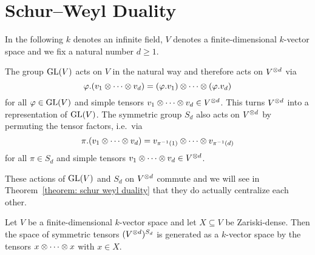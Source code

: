 \section{Schur--Weyl Duality}

\begin{conventions}
  In the following $k$ denotes an infinite field, $V$ denotes a finite-dimensional $k$-vector space and we fix a natural number $d \geq 1$.
\end{conventions}

\begin{fluff}
  The group $\operatorname{GL}(V)$ acts on $V$ in the natural way and therefore acts on $V^{\mathbin{\otimes} d}$ via
  \[
      \varphi.(v_1 \mathbin{\otimes} \dotsb \mathbin{\otimes} v_d)
    = (\varphi.v_1) \mathbin{\otimes} \dotsb \mathbin{\otimes} (\varphi.v_d)
  \]
  for all $\varphi \in \operatorname{GL}(V)$ and simple tensors $v_1 \mathbin{\otimes} \dotsb \mathbin{\otimes} v_d \in V^{\mathbin{\otimes} d}$.
  This turns $V^{\mathbin{\otimes} d}$ into a representation of $\operatorname{GL}(V)$.
  The symmetric group $S_d$ also acts on $V^{\mathbin{\otimes} d}$ by permuting the tensor factors, i.e.\ via
  \[
      \pi.(v_1 \mathbin{\otimes} \dotsb \mathbin{\otimes} v_d)
    = v_{\pi^{-1}(1)} \mathbin{\otimes} \dotsb \mathbin{\otimes} v_{\pi^{-1}(d)}
  \]
  for all $\pi \in S_d$ and simple tensors $v_1 \mathbin{\otimes} \dotsb \mathbin{\otimes} v_d \in V^{\mathbin{\otimes} d}$. 
  
  These actions of $\operatorname{GL}(V)$ and $S_d$ on $V^{\mathbin{\otimes} d}$ commute and we will see in Theorem~\ref{theorem: schur weyl duality} that they do actually centralize each other.
\end{fluff}


\begin{lemma}
  \label{lemma: symmetric tensors and zariski dense subsets}
  Let $V$ be a finite-dimensional $k$-vector space and let $X \subseteq V$ be Zariski-dense.
  Then the space of symmetric tensors $( V^{\mathbin{\otimes} d} )^{S_d}$ is generated as a $k$-vector space by the tensors $x \mathbin{\otimes} \dotsb \mathbin{\otimes} x$ with $x \in X$.
\end{lemma}


